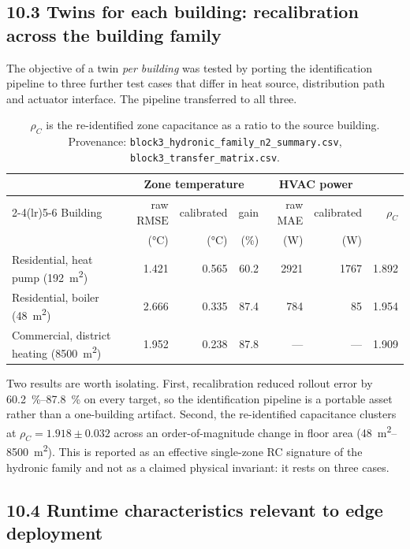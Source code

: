 \documentclass[11pt,a4paper]{article}
\newcommand{\RMSE}{\ensuremath{\mathrm{RMSE}}}
\begin{document}
\subsection*{10.3 Twins for each building: recalibration across the building family}

The objective of a twin \emph{per building} was tested by porting the identification pipeline to
three further test cases that differ in heat source, distribution path and actuator interface.
The pipeline transferred to all three.

\begin{table}[h]
\centering\small
\setlength{\tabcolsep}{4pt}
\begin{tabular}{@{}lrrrrrr@{}}
\toprule
& \multicolumn{3}{c}{Zone temperature} & \multicolumn{2}{c}{HVAC power} & \\
\cmidrule(lr){2-4}\cmidrule(lr){5-6}
Building & raw \RMSE & calibrated & gain & raw MAE & calibrated & $\rho_C$ \\
& (\si{\celsius}) & (\si{\celsius}) & (\%) & (\si{\watt}) & (\si{\watt}) & \\
\midrule
Residential, heat pump (\SI{192}{\meter\squared}) & 1.421 & 0.565 & 60.2 & 2921 & 1767 & 1.892 \\
Residential, boiler (\SI{48}{\meter\squared}) & 2.666 & 0.335 & 87.4 & 784 & 85 & 1.954 \\
Commercial, district heating (\SI{8500}{\meter\squared}) & 1.952 & 0.238 & 87.8 & --- & --- & 1.909 \\
\bottomrule
\end{tabular}
\caption*{\small $\rho_C$ is the re-identified zone capacitance as a ratio to the source building.
Provenance: \texttt{block3\_hydronic\_family\_n2\_summary.csv},
\texttt{block3\_transfer\_matrix.csv}.}
\end{table}

Two results are worth isolating. First, recalibration reduced rollout error by
\SIrange{60.2}{87.8}{\percent} on every target, so the identification pipeline is a portable
asset rather than a one-building artifact. Second, the re-identified capacitance clusters at
$\rho_C = 1.918 \pm 0.032$ across an order-of-magnitude change in floor area
(\SIrange{48}{8500}{\meter\squared}). This is reported as an effective single-zone RC signature
of the hydronic family and not as a claimed physical invariant: it rests on three cases.

\subsection*{10.4 Runtime characteristics relevant to edge deployment}
\end{document}
